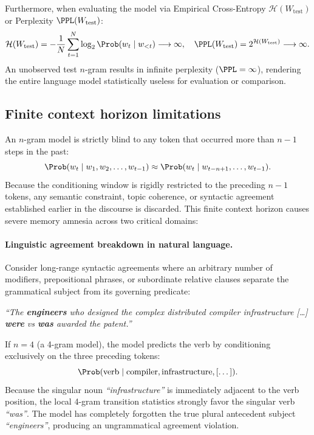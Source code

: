 \documentclass[../../main.tex]{subfiles}
\begin{document}
Furthermore, when evaluating the model via Empirical Cross-Entropy $\mathcal{H}(W_{\text{test}})$ or Perplexity $\PPL(W_{\text{test}})$:
\begin{equation}
\label{eq:ppl_zero_collapse}
\mathcal{H}(W_{\text{test}}) = -\frac{1}{N} \sum_{t=1}^N \log_2 \Prob(w_t \mid w_{<t}) \longrightarrow \infty, \quad \PPL(W_{\text{test}}) = 2^{\mathcal{H}(W_{\text{test}})} \longrightarrow \infty.
\end{equation}
An unobserved test $n$-gram results in infinite perplexity ($\PPL = \infty$), rendering the entire language model statistically useless for evaluation or comparison.

\subsection{Finite context horizon limitations}
An $n$-gram model is strictly blind to any token that occurred more than $n-1$ steps in the past:
\begin{equation}
\label{eq:context_truncation}
\Prob(w_t \mid w_1, w_2, \dots, w_{t-1}) \approx \Prob(w_t \mid w_{t-n+1}, \dots, w_{t-1}).
\end{equation}
Because the conditioning window is rigidly restricted to the preceding $n-1$ tokens, any semantic constraint, topic coherence, or syntactic agreement established earlier in the discourse is discarded. This finite context horizon causes severe memory amnesia across two critical domains:

\paragraph{Linguistic agreement breakdown in natural language.}
Consider long-range syntactic agreements where an arbitrary number of modifiers, prepositional phrases, or subordinate relative clauses separate the grammatical subject from its governing predicate:
\begin{center}
\textit{``The \textbf{engineers} who designed the complex distributed compiler infrastructure [\dots] \textbf{were} vs \textbf{was} awarded the patent.''}
\end{center}
If $n = 4$ (a 4-gram model), the model predicts the verb by conditioning exclusively on the three preceding tokens:
\[
\Prob(\text{verb} \mid \text{compiler}, \text{infrastructure}, [\dots]).
\]
Because the singular noun \textit{``infrastructure''} is immediately adjacent to the verb position, the local 4-gram transition statistics strongly favor the singular verb \textit{``was''}. The model has completely forgotten the true plural antecedent subject \textit{``engineers''}, producing an ungrammatical agreement violation.
\end{document}
